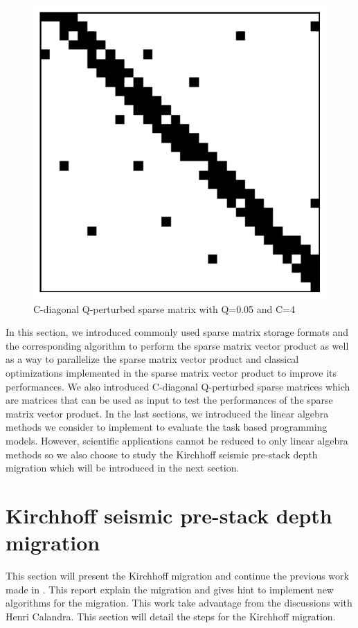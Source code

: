 \begin{figure}[H]
	\centering
	\includegraphics[width=.5\textwidth]{cqmat}
	\caption{C-diagonal Q-perturbed sparse matrix with Q=0.05 and C=4\label{fig:cqmat}}
\end{figure}

In this section, we introduced commonly used sparse matrix storage formats and the corresponding algorithm to perform the sparse matrix vector product as well as a way to parallelize the sparse matrix vector product and classical optimizations implemented in the sparse matrix vector product to improve its performances.
We also introduced C-diagonal Q-perturbed sparse matrices which are matrices that can be used as input to test the performances of the sparse matrix vector product.
In the last sections, we introduced the linear algebra methods we consider to implement to evaluate the task based programming models.
However, scientific applications cannot be reduced to only linear algebra methods so we also choose to study the Kirchhoff seismic pre-stack depth migration which will be introduced in the next section.

\section{Kirchhoff seismic pre-stack depth migration}

This section will present the Kirchhoff migration and continue the previous work made in \cite{rapport_Total_Petiton}.
This report explain the migration and gives hint to implement new algorithms for the migration.
This work take advantage from the discussions with Henri Calandra.
This section will detail the steps for the Kirchhoff migration.

